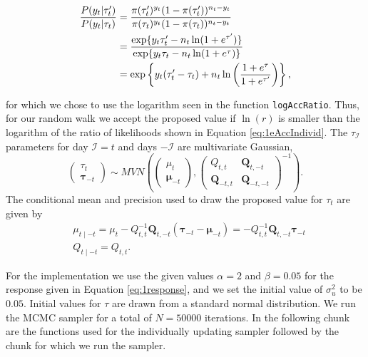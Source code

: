\documentclass[
]{article}
\begin{document}
\begin{align}\label{eq:1eAccIndivid}
  \frac{P({y}_{t}|{\tau}'_t)}
  {P({y}_t | {\tau}_t)} 
  &= 
  \frac{\pi(\tau_t')^{y_t}(1-\pi(\tau_t'))^{n_t-y_t}}
  {\pi(\tau_t)^{y_t}(1-\pi(\tau_t))^{n_t-y_t}}              \notag \\
  &= 
  \frac{ \exp\{y_t\tau_t' - n_t \ln(1+e^{\tau'})\}}
  {\exp\{y_t\tau_t - n_t \ln(1+e^{\tau})\}}                 \notag \\
  &=
  \exp\left\{y_t(\tau'_t - \tau_t) + n_t\ln \left( \frac{1+e^{\tau}}{1+e^{\tau'}}\right)
  \right\}, 
\end{align}

for which we chose to use the logarithm seen in the function \texttt{logAccRatio}. Thus, for our random walk we accept the proposed value if \(\ln(r)\) is smaller than the logarithm of the ratio of likelihoods shown in Equation \eqref{eq:1eAccIndivid}. The \(\tau_ \mathcal{I}\) parameters for day \(\mathcal{I} = t\) and days \(- \mathcal{I}\) are multivariate Gaussian,
\[
\left(\begin{array}{l}
  {\tau}_{t} \\ 
  \boldsymbol{\tau}_{-t} 
\end{array}\right) 
\sim 
M V N\left(\left(\begin{array}{l}
{\mu}_{t} \\
\boldsymbol{\mu}_{-t}
\end{array}\right),\left(\begin{array}{ll}
{Q}_{t,t} & \mathbf{Q}_{t, -t} \\
\mathbf{Q}_{-t, t} & \mathbf{Q}_{-t,-t}
\end{array}\right)^{-1}\right).
\]
The conditional mean and precision used to draw the proposed value for \(\tau_t\) are given by
\[
\begin{aligned}
  &{\mu}_{t \mid -t}={\mu}_{t}-{Q}_{t, t}^{-1} \boldsymbol{Q}_{t,-t} \left(\boldsymbol{\tau}_{-t}-\boldsymbol{\mu}_{-t}\right) 
  = -Q_{t,t}^{-1} \boldsymbol{Q}_{t,-t}\boldsymbol{\tau}_{-t}
  \\
  &{Q}_{t \mid -t}={Q}_{t,t}.
\end{aligned}
\]

For the implementation we use the given values \(\alpha = 2\) and \(\beta = 0.05\) for the response given in Equation \eqref{eq:1response}, and we set the initial value of \(\sigma_u^2\) to be \(0.05\). Initial values for \(\tau\) are drawn from a standard normal distribution. We run the MCMC sampler for a total of \(N=50000\) iterations. In the following chunk are the functions used for the individually updating sampler followed by the chunk for which we run the sampler.
\end{document}
